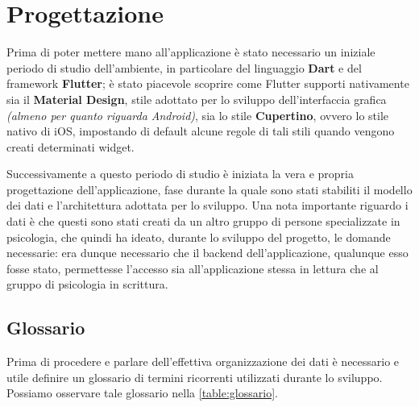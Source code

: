 \chapter{Progettazione}
\label{chap:progettazione}
Prima di poter mettere mano all'applicazione è stato necessario un iniziale periodo di studio dell'ambiente, in particolare del linguaggio \textbf{Dart} e del framework \textbf{Flutter}; è stato piacevole scoprire come Flutter supporti nativamente sia il \textbf{Material Design}, stile adottato per lo sviluppo dell'interfaccia grafica \textit{(almeno per quanto riguarda Android)}, sia lo stile \textbf{Cupertino}, ovvero lo stile nativo di iOS, impostando di default alcune regole di tali stili quando vengono creati determinati widget.

Successivamente a questo periodo di studio è iniziata la vera e propria progettazione dell'applicazione, fase durante la quale sono stati stabiliti il modello dei dati e l'architettura adottata per lo sviluppo. Una nota importante riguardo i dati è che questi sono stati creati da un altro gruppo di persone specializzate in psicologia, che quindi ha ideato, durante lo sviluppo del progetto, le domande necessarie: era dunque necessario che il backend dell'applicazione, qualunque esso fosse stato, permettesse l'accesso sia all'applicazione stessa in lettura che al gruppo di psicologia in scrittura.

\newpage

\section{Glossario}
Prima di procedere e parlare dell'effettiva organizzazione dei dati è necessario e utile definire un glossario di termini ricorrenti utilizzati durante lo sviluppo. Possiamo osservare tale glossario nella \autoref{table:glossario}.



